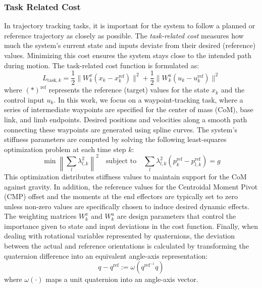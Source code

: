 \documentclass[main.tex]{subfiles}
\begin{document}
\subsubsection{Task Related Cost}
In trajectory tracking tasks, it is important for the system to follow a planned or reference trajectory as closely as possible. The \textit{task-related cost} measures how much the system's current state and inputs deviate from their desired (reference) values. Minimizing this cost ensures the system stays close to the intended path during motion.
The task-related cost function is formulated as:
\begin{equation}
L_{\text{task},k} = \frac{1}{2} \| W^x_k (x_k - x^{\text{ref}}_k) \|^2 + \frac{1}{2} \| W^u_k (u_k - u^{\text{ref}}_k) \|^2
\end{equation}
where $(\ast)^{\text{ref}}$ represents the reference (target) values for the state $x_k$ and the control input $u_k$.
In this work, we focus on a waypoint-tracking task, where a series of intermediate waypoints are specified for the center of mass (CoM), base link, and limb endpoints. Desired positions and velocities along a smooth path connecting these waypoints are generated using spline curves.
The system's stiffness parameters are computed by solving the following least-squares optimization problem at each time step $k$:
\begin{equation}
\min \left\| \sum_l \lambda_{l,k}^2 \right\|^2 \quad \text{subject to} \quad \sum_l \lambda_{l,k}^2 (p^{\text{ref}}_k - p^{\text{ref}}_{l,k}) = g
\end{equation}
This optimization distributes stiffness values to maintain support for the CoM against gravity.
In addition, the reference values for the Centroidal Moment Pivot (CMP) offset and the moments at the end effectors are typically set to zero unless non-zero values are specifically chosen to induce desired dynamic effects.
The weighting matrices $W^x_k$ and $W^u_k$ are design parameters that control the importance given to state and input deviations in the cost function.
Finally, when dealing with rotational variables represented by quaternions, the deviation between the actual and reference orientations is calculated by transforming the quaternion difference into an equivalent angle-axis representation:
\begin{equation}
q - q^{\text{ref}} := \omega(q^{\text{ref}^{-1}} q)
\end{equation}
where $\omega(\cdot)$ maps a unit quaternion into an angle-axis vector.
\end{document}
